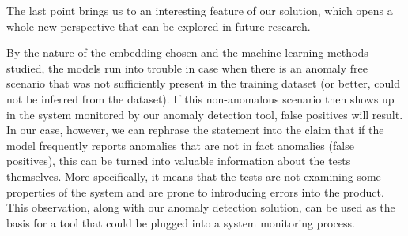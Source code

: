 The last point brings us to an interesting feature of our solution, which opens a whole new perspective that can be explored in future research.

By the nature of the embedding chosen and the machine learning methods studied, the models run into trouble in case when there is an anomaly free scenario that was not sufficiently present in the training dataset (or better, could not be inferred from the dataset). If this non-anomalous scenario then shows up in the system monitored by our anomaly detection tool, false positives will result.\\
In our case, however, we can rephrase the statement into the claim that if the model frequently reports anomalies that are not in fact anomalies (false positives), this can be turned into valuable information about the tests themselves. 
More specifically, it means that the tests are not examining some properties of the system and are prone to introducing errors into the product. 
This observation, along with our anomaly detection solution, can be used as the basis for a tool that could be plugged into a system monitoring process.
